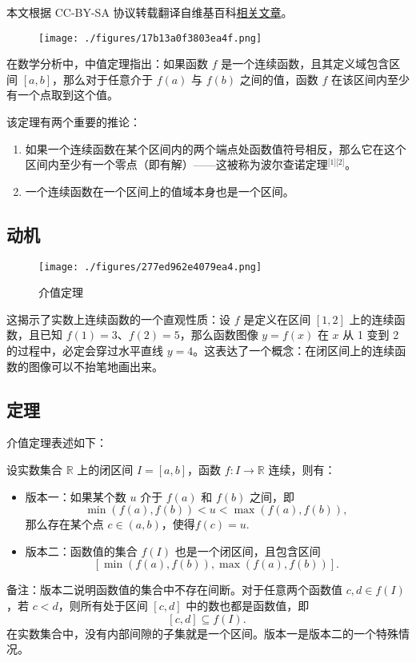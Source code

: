 
本文根据 CC-BY-SA 协议转载翻译自维基百科\href{https://en.wikipedia.org/wiki/Intermediate_value_theorem}{相关文章}。

\begin{figure}[ht]
\centering
\texttt{[image: ./figures/17b13a0f3803ea4f.png]}
\caption{} \label{fig_JZDL_1}
\end{figure}
在数学分析中，中值定理指出：如果函数 $f$ 是一个连续函数，且其定义域包含区间 $[a, b]$，那么对于任意介于 $f(a)$ 与 $f(b)$ 之间的值，函数 $f$ 在该区间内至少有一个点取到这个值。

该定理有两个重要的推论：
\begin{enumerate}
\item 如果一个连续函数在某个区间内的两个端点处函数值符号相反，那么它在这个区间内至少有一个零点（即有解）——这被称为波尔查诺定理\(^\text{[1][2]}\)。
\item 一个连续函数在一个区间上的值域本身也是一个区间。
\end{enumerate}
\subsection{动机}
\begin{figure}[ht]
\centering
\texttt{[image: ./figures/277ed962e4079ea4.png]}
\caption{介值定理} \label{fig_JZDL_2}
\end{figure}
这揭示了实数上连续函数的一个直观性质：设 $f$ 是定义在区间 $[1, 2]$ 上的连续函数，且已知 $f(1) = 3$、$f(2) = 5$，那么函数图像 $y = f(x)$ 在 $x$ 从 1 变到 2 的过程中，必定会穿过水平直线 $y = 4$。这表达了一个概念：在闭区间上的连续函数的图像可以不抬笔地画出来。
\subsection{定理}
介值定理表述如下：

设实数集合 $\mathbb{R}$ 上的闭区间 $I = [a, b]$，函数 $f: I \to \mathbb{R}$ 连续，则有：

\begin{itemize}
\item 版本一：如果某个数 $u$ 介于 $f(a)$ 和 $f(b)$ 之间，即
$$
\min(f(a), f(b)) < u < \max(f(a), f(b)),~
$$
那么存在某个点 $c \in (a, b)$，使得$f(c) = u$.
\item 版本二：函数值的集合 $f(I)$ 也是一个闭区间，且包含区间
$$
[\min(f(a), f(b)), \max(f(a), f(b))].~
$$
\end{itemize}
备注：版本二说明函数值的集合中不存在间断。对于任意两个函数值 $c, d \in f(I)$，若 $c < d$，则所有处于区间 $[c, d]$ 中的数也都是函数值，即
$$
[c, d] \subseteq f(I).~
$$
在实数集合中，没有内部间隙的子集就是一个区间。版本一是版本二的一个特殊情况。
